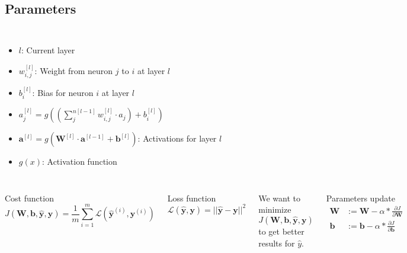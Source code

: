 \documentclass{beamer}
\begin{document}
\subsection{Parameters}
\begin{frame}{\subsecname}
    \begin{columns}[t]
        \begin{itemize}
            \item $l$: Current layer
            \item $w_{i, j}^{[l]}$: Weight from neuron $j$ to $i$ at layer $l$
            \item $b_{i}^{[l]}$: Bias for neuron $i$ at layer $l$
            \item $a_{j}^{[l]} = g\left( \left( \sum_{j}^{n[l-1]}  w_{i, j}^{[l]} \cdot a_{j} \right) + b_i^{[l]} \right)$
            \item $\bm{a}^{[l]} = g(\bm{W}^{[l]}\cdot \bm{a}^{[l - 1]} + \bm{b}^{[l]})$: Activations for layer $l$
            \item $g(x)$: Activation function
        \end{itemize}
        \centering
        
    \end{columns}
\end{frame}
\begin{frame}
    \begin{columns}
        \begin{block}{Cost function}
            $$
            J(\bm{W}, \bm{b}, \hat{\bm{y}}, \bm{y}) = \frac{1}{m} \sum_{i=1}^{m} \mathcal{L}(\hat{\bm{y}}^{(i)}, \bm{y}^{(i)})
            $$
        \end{block}
        \begin{block}{Loss function}
            $$
            \mathcal{L}(\hat{\bm{y}}, \bm{y}) = ||\hat{\bm{y}} - \bm{y}||^2
            $$
        \end{block}
        We want to minimize $J(\bm{W}, \bm{b}, \hat{\bm{y}}, \bm{y})$ to get better results for $\hat{y}$.
        \begin{block}{Parameters update}
            \begin{align*}
                \bm{W} &:= \bm{W} - \alpha*\frac{\partial J}{\partial \bm{W}} \\
                \bm{b} &:= \bm{b} - \alpha*\frac{\partial J}{\partial \bm{b}}
            \end{align*}
        \end{block}
    \end{columns}
\end{frame}
\end{document}
